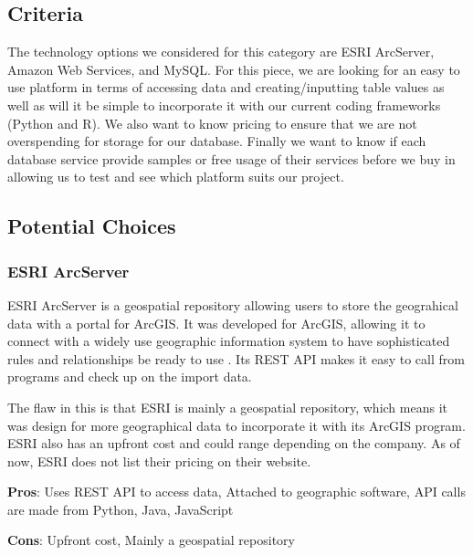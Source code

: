 \documentclass[10pt, onecolumn, draftclsnofoot, letterpaper, compsoc]{IEEEtran}
\begin{document}
\subsection{Criteria}
The technology options we considered for this category are ESRI ArcServer, Amazon Web Services, and MySQL.
For this piece, we are looking for an easy to use platform in terms of accessing data and creating/inputting table values as well as will it be simple to incorporate it with our current coding frameworks (Python and R).
We also want to know pricing to ensure that we are not overspending for storage for our database.
Finally we want to know if each database service provide samples or free usage of their services before we buy in allowing us to test and see which platform suits our project.

\subsection{Potential Choices}
    \subsubsection{ESRI ArcServer}
    ESRI ArcServer is a geospatial repository allowing users to store the geograhical data with a portal for ArcGIS.
    It was developed for ArcGIS, allowing it to connect with a widely use geographic information system to have sophisticated rules and relationships be ready to use \cite{arcgis}.
    Its REST API makes it easy to call from programs and check up on the import data.\par
    The flaw in this is that ESRI is mainly a geospatial repository, which means it was design for more geographical data to incorporate it with its ArcGIS program.
    ESRI also has an upfront cost and could range depending on the company.
    As of now, ESRI does not list their pricing on their website.
    
    
    \textbf{Pros}: Uses REST API to access data, Attached to geographic software, API calls are made from Python, Java, JavaScript
    
    \textbf{Cons}: Upfront cost, Mainly a geospatial repository
    
\end{document}
